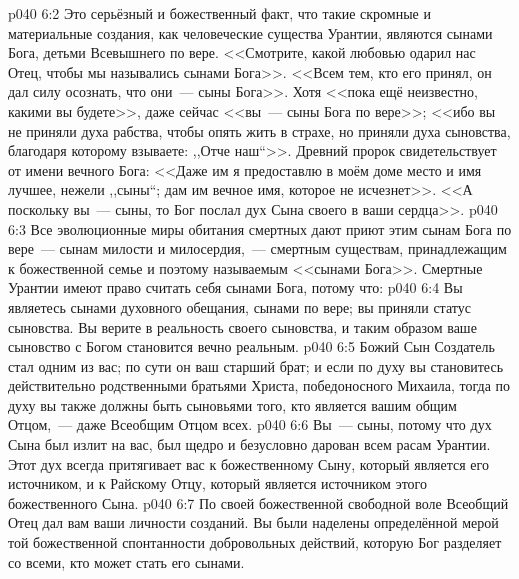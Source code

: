 \vs p040 6:2 Это серьёзный и божественный факт, что такие скромные и материальные создания, как человеческие существа Урантии, являются сынами Бога, детьми Всевышнего по вере. <<Смотрите, какой любовью одарил нас Отец, чтобы мы назывались сынами Бога>>. <<Всем тем, кто его принял, он дал силу осознать, что они~--- сыны Бога>>. Хотя <<пока ещё неизвестно, какими вы будете>>, даже сейчас <<вы~--- сыны Бога по вере>>; <<ибо вы не приняли духа рабства, чтобы опять жить в страхе, но приняли духа сыновства, благодаря которому взываете: ,,Отче наш``>>. Древний пророк свидетельствует от имени вечного Бога: <<Даже им я предоставлю в моём доме место и имя лучшее, нежели ,,сыны``; дам им вечное имя, которое не исчезнет>>. <<А поскольку вы~--- сыны, то Бог послал дух Сына своего в ваши сердца>>.
\vs p040 6:3 Все эволюционные миры обитания смертных дают приют этим сынам Бога по вере~--- сынам милости и милосердия,~--- смертным существам, принадлежащим к божественной семье и поэтому называемым <<сынами Бога>>. Смертные Урантии имеют право считать себя сынами Бога, потому что:
\vs p040 6:4 Вы являетесь сынами духовного обещания, сынами по вере; вы приняли статус сыновства. Вы верите в реальность своего сыновства, и таким образом ваше сыновство с Богом становится вечно реальным.
\vs p040 6:5 Божий Сын Создатель стал одним из вас; по сути он ваш старший брат; и если по духу вы становитесь действительно родственными братьями Христа, победоносного Михаила, тогда по духу вы также должны быть сыновьями того, кто является вашим общим Отцом,~--- даже Всеобщим Отцом всех.
\vs p040 6:6 Вы~--- сыны, потому что дух Сына был излит на вас, был щедро и безусловно дарован всем расам Урантии. Этот дух всегда притягивает вас к божественному Сыну, который является его источником, и к Райскому Отцу, который является источником этого божественного Сына.
\vs p040 6:7 По своей божественной свободной воле Всеобщий Отец дал вам ваши личности созданий. Вы были наделены определённой мерой той божественной спонтанности добровольных действий, которую Бог разделяет со всеми, кто может стать его сынами.
